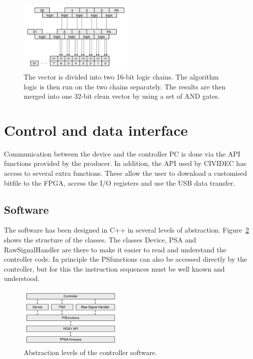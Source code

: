 \begin{figure}[!t]
\centering
\includegraphics[width=0.5\textwidth]{05_current_monitoring/plots/algobase}
\caption{The vector is divided into two 16-bit logic chains. The algorithm logic is then run on the two chains separately. The results are then merged into one 32-bit clean vector by using a set of AND gates.}
\label{fig:algobase}
\end{figure}


\section{Control and data interface}
Communication between the device and the controller PC is done via the API functions provided by the producer. In addition, the API used by CIVIDEC has access to several extra functions. These allow the user to download a customised bitfile to the FPGA, access the I/O registers and use the USB data transfer.

\subsection{Software}
The software has been designed in C++ in several levels of abstraction. Figure~\ref{fig:controller} shows the structure of the classes. The classes Device, PSA and RawSignalHandler are there to make it easier to read and understand the controller code. In principle the PSfunctions can also be accessed directly by the controller, but for this the instruction sequences must be well known and understood. 

\begin{figure}[!t]
\centering
\includegraphics[width=0.45\textwidth]{05_current_monitoring/plots/controller}
\caption{Abstraction levels of the controller software.}
\label{fig:controller}
\end{figure}


